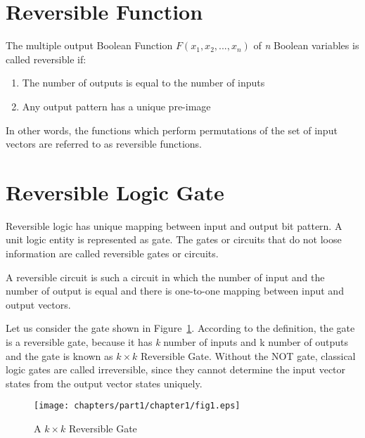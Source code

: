 \section{Reversible Function}
The multiple output Boolean Function $F(x_1, x_2, ...,x_n)$ of \textit{n} Boolean variables is called reversible if:
\begin{enumerate}
\item The number of outputs is equal to the number of inputs
\item Any output pattern has a unique pre-image
\end{enumerate}


In other words, the functions which perform permutations of the set of input vectors are referred to as reversible functions.

\section{Reversible Logic Gate}
Reversible logic has unique mapping between input and output bit pattern. A unit logic entity is represented as gate. The gates or circuits that do not loose information are called reversible gates or circuits.

\begin{property}\textnormal{
A reversible circuit is such a circuit in which the number of input and the number of output is equal and there is one-to-one mapping between input and output vectors.}
\end{property}

Let us consider the gate shown in Figure~\ref{fig:p1_c1_fig1}. According to the definition, the gate is a reversible gate, because it has \textit{k} number of inputs and k number of outputs and the gate is known as $k \times k$ Reversible Gate. Without the NOT gate, classical logic gates are called irreversible, since they cannot determine the input vector states from the output vector states uniquely.
\begin{figure}[H]
\centering
\texttt{[image: chapters/part1/chapter1/fig1.eps]}
\caption{A $k \times k$ Reversible Gate}
\label{fig:p1_c1_fig1}
\end{figure}

